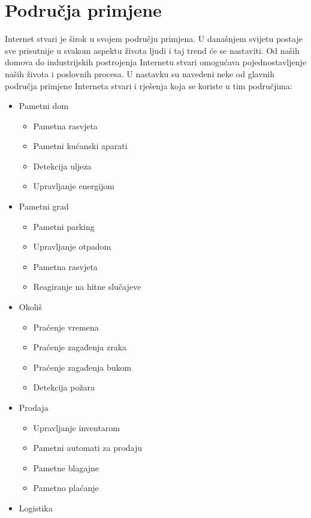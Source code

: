 \documentclass[times, utf8, diplomski]{fer}
\begin{document}
\section{Područja primjene}
Internet stvari je širok u svojem području primjena. U današnjem svijetu postaje sve prisutnije u svakom aspektu života ljudi i taj trend će se nastaviti. Od naših domova do industrijskih postrojenja Internetu stvari omogućava pojednostavljenje naših života i poslovnih procesa. U nastavku su navedeni neke od glavnih područja primjene Interneta stvari i rješenja koja se koriste u tim područjima:
\begin{itemize}
    \item Pametni dom
    \begin{itemize}
        \item Pametna rasvjeta
        \item Pametni kućanski aparati
        \item Detekcija uljeza
        \item Upravljanje energijom
    \end{itemize}
    \item Pametni grad
    \begin{itemize}
        \item Pametni parking
        \item Upravljanje otpadom
        \item Pametna rasvjeta
        \item Reagiranje na hitne slučajeve
    \end{itemize}
    \item Okoliš
    \begin{itemize}
        \item Praćenje vremena
        \item Praćenje zagađenja zraka
        \item Praćenje zagađenja bukom
        \item Detekcija požara
    \end{itemize}
    \item Prodaja
    \begin{itemize}
        \item Upravljanje inventarom
        \item Pametni automati za prodaju
        \item Pametne blagajne
        \item Pametno plaćanje
    \end{itemize}
    \item Logistika

\end{itemize}
\end{document}
